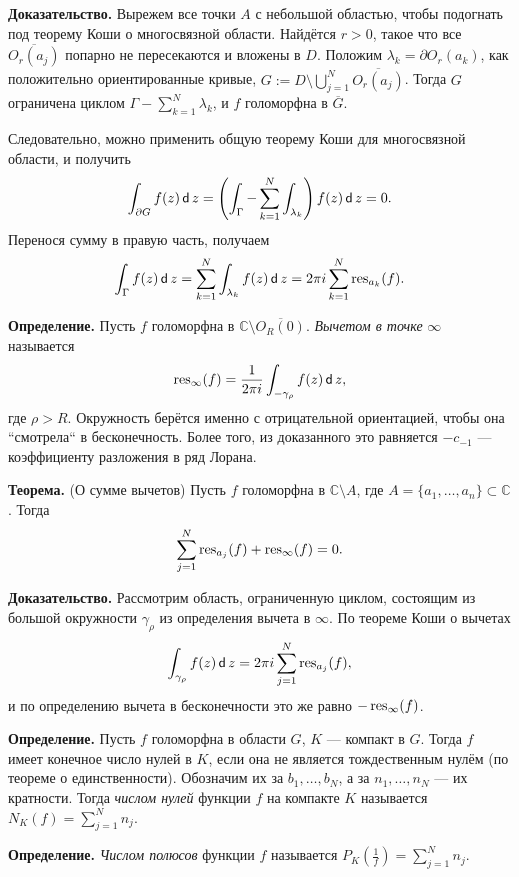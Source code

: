 \textbf{Доказательство.} Вырежем все точки $A$ с небольшой областью, чтобы подогнать под теорему Коши о многосвязной области.
Найдётся $r > 0$, такое что все $\overline{O_r(a_j)}$ попарно не пересекаются и вложены в $D$.
Положим $\lambda_k = \partial O_r(a_k)$, как положительно ориентированные кривые, $G := D \setminus \bigcup_{j=1}^N \overline{O_r(a_j)}$.
Тогда $G$ ограничена циклом $\Gamma - \sum_{k=1}^{N} \lambda_k$, и $f$ голоморфна в $\overline G$.

Следовательно, можно применить общую теорему Коши для многосвязной области, и получить
\[
    \int_{\partial G} f(z) \operatorname{\mathsf d} z = \left( \int_\Gamma - \sum_{k=1}^{N} \int_{\lambda_k} \right) f(z) \operatorname{\mathsf d} z = 0.
\]
Перенося сумму в правую часть, получаем
\[
    \int_\Gamma f(z) \operatorname{\mathsf d} z = \sum_{k=1}^{N} \int_{\lambda_k} f(z) \operatorname{\mathsf d} z = 2\pi i \sum_{k=1}^{N} \operatorname{res}_{a_k}(f).
\]

\QED

\textbf{Определение.} Пусть $f$ голоморфна в $\mathbb C \setminus \overline{O_R(0)}$. \textit{Вычетом в точке} $\infty$ называется
\[
    \operatorname{res}_{\infty}(f) = \frac{1}{2\pi i} \int_{-\gamma_\rho} f(z) \operatorname{\mathsf d} z,
\]
где $\rho > R$.
Окружность берётся именно с отрицательной ориентацией, чтобы она ``смотрела`` в бесконечность.
Более того, из доказанного это равняется $-c_{-1}$ --- коэффициенту разложения в ряд Лорана.

\textbf{Теорема.} (О сумме вычетов) Пусть $f$ голоморфна в $\mathbb C \setminus A$, где $A = \{a_1, \dots, a_n\} \subset \mathbb C$.
Тогда
\[
    \sum_{j=1}^{N} \operatorname{res}_{a_j}(f) + \operatorname{res}_{\infty}(f) = 0.
\]

\textbf{Доказательство.} Рассмотрим область, ограниченную циклом, состоящим из большой окружности $\gamma_\rho$ из определения вычета в $\infty$.
По теореме Коши о вычетах
\[
    \int_{\gamma_\rho} f(z) \operatorname{\mathsf d} z = 2\pi i \sum_{j=1}^{N} \operatorname{res}_{a_j}(f),
\]
и по определению вычета в бесконечности это же равно $-\operatorname{res}_\infty(f)$.

\QED

\textbf{Определение.} Пусть $f$ голоморфна в области $G$, $K$ --- компакт в $G$.
Тогда $f$ имеет конечное число нулей в $K$, если она не является тождественным нулём (по теореме о единственности).
Обозначим их за $b_1, \dots, b_N$, а за $n_1, \dots, n_N$ --- их кратности.
Тогда \textit{числом нулей} функции $f$ на компакте $K$ называется $N_K(f) = \sum_{j=1}^{N} n_j$.

\textbf{Определение.} \textit{Числом полюсов} функции $f$ называется $P_K(\frac{1}{f}) = \sum_{j=1}^{N} n_j$.

